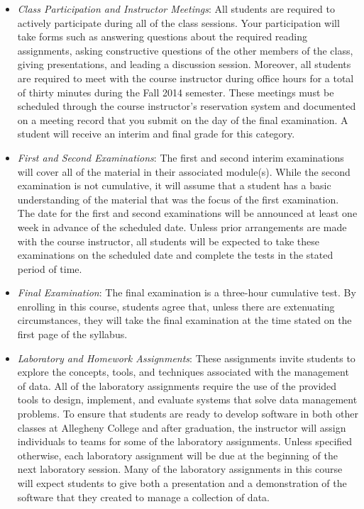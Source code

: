 \begin{itemize}

  \item {\em Class Participation and Instructor Meetings}: All students are required to actively participate during all
    of the class sessions. Your participation will take forms such as answering questions about the required reading
    assignments, asking constructive questions of the other members of the class, giving presentations, and leading a
    discussion session. Moreover, all students are required to meet with the course instructor during office hours
    for a total of thirty minutes during the Fall 2014 semester.  These meetings must be scheduled through the course
    instructor's reservation system and documented on a meeting record that you submit on the day of the final
    examination. A student will receive an interim and final grade for this category.

  \item {\em First and Second Examinations}: The first and second interim examinations will cover all of the material
    in their associated module(s).  While the second examination is not cumulative, it will assume that a student has a
    basic understanding of the material that was the focus of the first examination.  The date for the first and
    second examinations will be announced at least one week in advance of the scheduled date.  Unless prior
    arrangements are made with the course instructor, all students will be expected to take these examinations on the
    scheduled date and complete the tests in the stated period of time.

  \item {\em Final Examination}: The final examination is a three-hour cumulative test.  By enrolling in this course,
    students agree that, unless there are extenuating circumstances, they will take the final examination at the
    time stated on the first page of the syllabus.

  \item {\em Laboratory and Homework Assignments}: These assignments invite students to explore the concepts, tools, and
    techniques associated with the management of data.  All of the laboratory assignments require the use of the
    provided tools to design, implement, and evaluate systems that solve data management problems.  To ensure that
    students are ready to develop software in both other classes at Allegheny College and after graduation, the
    instructor will assign individuals to teams for some of the laboratory assignments.  Unless specified otherwise,
    each laboratory assignment will be due at the beginning of the next laboratory session.  Many of the laboratory
    assignments in this course will expect students to give both a presentation and a demonstration of the software that
    they created to manage a collection of data.  


\end{itemize}
